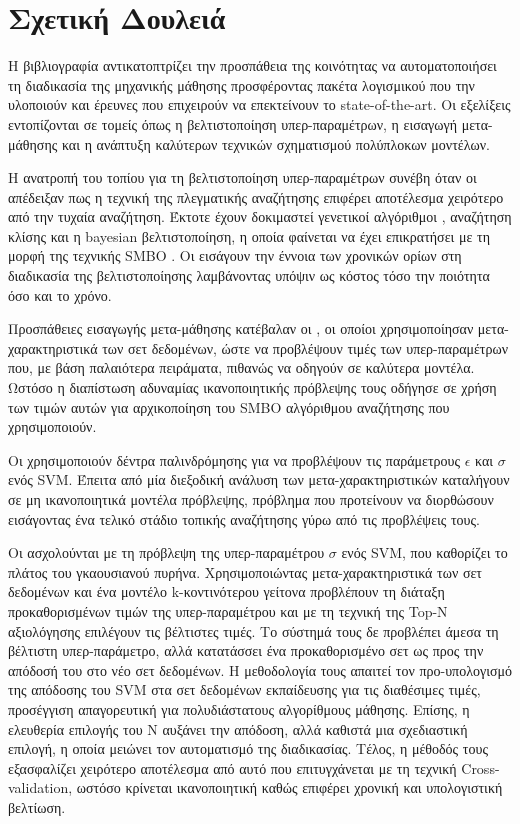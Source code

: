 \chapter{Σχετική Δουλειά}
Η βιβλιογραφία αντικατοπτρίζει την προσπάθεια της κοινότητας να αυτοματοποιήσει τη διαδικασία της μηχανικής μάθησης προσφέροντας πακέτα λογισμικού που την υλοποιούν και έρευνες που επιχειρούν να επεκτείνουν το state-of-the-art. Οι εξελίξεις εντοπίζονται σε τομείς όπως η βελτιστοποίηση υπερ-παραμέτρων, η εισαγωγή μετα-μάθησης και η ανάπτυξη καλύτερων τεχνικών σχηματισμού πολύπλοκων μοντέλων.

Η ανατροπή του τοπίου για τη βελτιστοποίηση υπερ-παραμέτρων συνέβη όταν οι \citet{Bergstra:2012:RSH:2188385.2188395} απέδειξαν πως η τεχνική της πλεγματικής αναζήτησης επιφέρει αποτέλεσμα χειρότερο από την τυχαία αναζήτηση. Έκτοτε έχουν δοκιμαστεί γενετικοί αλγόριθμοι \citep{1554741}, αναζήτηση κλίσης \citep{wassenberg} και η bayesian βελτιστοποίηση, η οποία φαίνεται να έχει επικρατήσει με τη μορφή της τεχνικής SMBO \citep{DBLP:journals/corr/abs-1208-3719}. Οι \citet{HutHooLeyMur10} εισάγουν την έννοια των χρονικών ορίων στη διαδικασία της βελτιστοποίησης λαμβάνοντας υπόψιν ως κόστος τόσο την ποιότητα όσο και το χρόνο.

Προσπάθειες εισαγωγής μετα-μάθησης κατέβαλαν οι \citet{Feurer:2014:UMI:3015544.3015549}, οι οποίοι χρησιμοποίησαν μετα-χαρακτηριστικά των σετ δεδομένων, ώστε να προβλέψουν τιμές των υπερ-παραμέτρων που, με βάση παλαιότερα πειράματα, πιθανώς να οδηγούν σε καλύτερα μοντέλα. Ωστόσο η διαπίστωση αδυναμίας ικανοποιητικής πρόβλεψης τους οδήγησε σε χρήση των τιμών αυτών για αρχικοποίηση του SMBO αλγόριθμου αναζήτησης που χρησιμοποιούν.  

Οι \citet{kuba2002exploiting} χρησιμοποιούν δέντρα παλινδρόμησης για να προβλέψουν τις παράμετρους $\epsilon$ και $\sigma$ ενός \gls{SVM}. Έπειτα από μία διεξοδική ανάλυση των μετα-χαρακτηριστικών καταλήγουν σε μη ικανοποιητικά μοντέλα πρόβλεψης, πρόβλημα που προτείνουν να διορθώσουν εισάγοντας ένα τελικό στάδιο τοπικής αναζήτησης γύρω από τις προβλέψεις τους.


Οι \citet{Soares2004} ασχολούνται με τη πρόβλεψη της υπερ-παραμέτρου $\sigma$ ενός SVM, που καθορίζει το πλάτος του γκαουσιανού πυρήνα. Χρησιμοποιώντας μετα-χα\-ρακτηριστικά των σετ δεδομένων και ένα μοντέλο k-κοντινότερου γείτονα προβλέπουν τη διάταξη προκαθορισμένων τιμών της υπερ-παραμέτρου και με τη τεχνική της Top-Ν αξιολόγησης επιλέγουν τις βέλτιστες τιμές. Το σύστημά τους δε προβλέπει άμεσα τη βέλτιστη υπερ-παράμετρο, αλλά κατατάσσει ένα προκαθορισμένο σετ ως προς την απόδοσή του στο νέο σετ δεδομένων. Η μεθοδολογία τους απαιτεί τον προ-υπολογισμό της απόδοσης του SVM στα σετ δεδομένων εκπαίδευσης για τις διαθέσιμες τιμές, προσέγγιση απαγορευτική για πολυδιάστατους αλγορίθμους μάθησης. Επίσης, η ελευθερία επιλογής του Ν αυξάνει την απόδοση, αλλά καθιστά μια σχεδιαστική επιλογή, η οποία μειώνει τον αυτοματισμό της διαδικασίας. Τέλος, η μέθοδός τους εξασφαλίζει χειρότερο αποτέλεσμα από αυτό που επιτυγχάνεται με τη τεχνική Cross-validation, ωστόσο κρίνεται ικανοποιητική καθώς επιφέρει χρονική και υπολογιστική βελτίωση. 

